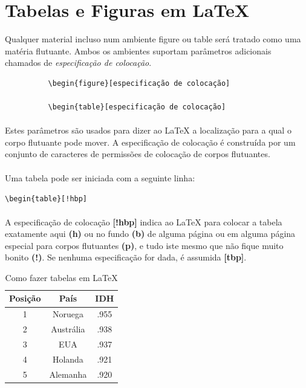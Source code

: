 \documentclass[a4paper,10pt]{report}
\begin{document}
\section{ Tabelas e Figuras em \LaTeX{}}

Qualquer material incluso num ambiente figure ou table será tratado como uma
matéria flutuante. Ambos os ambientes suportam parâmetros adicionais chamados
de \textit{especificação de colocação}.
      \begin{center}
        \begin{verbatim}
          \begin{figure}[especificação de colocação]

          \begin{table}[especificação de colocação]
        \end{verbatim}
      \end{center}

\paragraph{}
Estes parâmetros são usados para dizer ao \LaTeX{} a localização para a qual o corpo flutuante pode mover. A especificação de colocação é construída por um conjunto de caracteres de permissões de colocação de corpos flutuantes.

\paragraph{}
Uma tabela pode ser iniciada com a seguinte linha:
   \begin{center}
       \verb|\begin{table}[!hbp]|
   \end{center}

\paragraph{}
A especificação de colocação \textbf{[!hbp]} indica ao \LaTeX{} para colocar a tabela exatamente aqui \textbf{(h)} ou no fundo \textbf{(b)} de alguma página ou em alguma página especial para corpos flutuantes \textbf{(p)}, e tudo iste mesmo que não fique muito bonito \textbf{(!)}. Se nenhuma especificação for dada, é assumida \textbf{[tbp]}.
  \begin{table}[h]
            \centering
              \begin{tabular}{c|cc}
                Posição & País & IDH \\
                \hline
                1 & Noruega        & .955 \\
                2 & Austrália      & .938 \\
                3 & EUA            & .937 \\
                4 & Holanda        & .921 \\
                5 & Alemanha       & .920

              \end{tabular}
              \caption{Como fazer tabelas em \LaTeX}
          \end{table}
\end{document}
